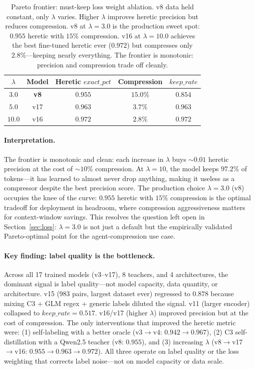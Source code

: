 \begin{table}[h]
\centering
\caption{Pareto frontier: must-keep loss weight ablation. v8 data held
constant, only $\lambda$ varies. Higher $\lambda$ improves heretic precision
but reduces compression. v8 at $\lambda{=}3.0$ is the production sweet spot:
$0.955$ heretic with $15\%$ compression. v16 at $\lambda{=}10.0$ achieves the
best fine-tuned heretic ever ($0.972$) but compresses only $2.8\%$---keeping
nearly everything. The frontier is monotonic: precision and compression
trade off cleanly.}
\label{tab:pareto}
\begin{tabular}{ccccc}
\toprule
$\lambda$ & Model & Heretic $\mathit{exact\_pct}$ & Compression & $\mathit{keep\_rate}$ \\
\midrule
$3.0$  & \textbf{v8}  & $0.955$ & $15.0\%$  & $0.854$ \\
$5.0$  & v17          & $0.963$ & $3.7\%$   & $0.963$ \\
$10.0$ & v16          & $0.972$ & $2.8\%$   & $0.972$ \\
\bottomrule
\end{tabular}
\end{table}

\paragraph{Interpretation.} The frontier is monotonic and clean: each
increase in $\lambda$ buys ${\sim}0.01$ heretic precision at the cost of
${\sim}10\%$ compression. At $\lambda{=}10$, the model keeps $97.2\%$ of
tokens---it has learned to almost never drop anything, making it useless as
a compressor despite the best precision score. The production choice
$\lambda{=}3.0$ (v8) occupies the knee of the curve: $0.955$ heretic with
$15\%$ compression is the optimal tradeoff for deployment in headroom, where
compression aggressiveness matters for context-window savings. This resolves
the question left open in Section~\ref{sec:loss}: $\lambda{=}3.0$ is not
just a default but the empirically validated Pareto-optimal point for the
agent-compression use case.

\paragraph{Key finding: label quality is the bottleneck.} Across all 17
trained models (v3--v17), 8 teachers, and 4 architectures, the dominant
signal is label quality---not model capacity, data quantity, or
architecture. v15 (983 pairs, largest dataset ever) regressed to $0.878$
because mixing C3 + GLM regex + generic labels diluted the signal. v11
(larger encoder) collapsed to $\mathit{keep\_rate}{=}0.517$. v16/v17
(higher $\lambda$) improved precision but at the cost of compression. The
only interventions that improved the heretic metric were: (1) self-labeling
with a better oracle (v3$\to$v4: $0.942\to0.967$), (2) C3 self-distillation
with a Qwen2.5 teacher (v8: $0.955$), and (3) increasing $\lambda$
(v8$\to$v17$\to$v16: $0.955\to0.963\to0.972$). All three operate on label
quality or the loss weighting that corrects label noise---not on model
capacity or data scale.

